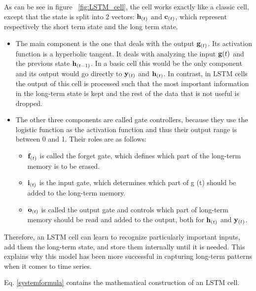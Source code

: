 As can be see in figure ~\ref{fig:LSTM_cell}, the cell works exactly like a classic cell, except that the state is split into 2 vectors: ${\bf h}_{(t)}$ and ${\bf c}_{(t)}$, which represent respectively the short term state and the long term state.
\begin{itemize}
    \item The main component is the one that deals with the output ${\bf g}_{(t)}$. Its activation function is a hyperbolic tangent. It deals with analyzing the input ${\bf g} {(t)}$ and the previous state ${\bf h}_{(t-1)}$. In a basic cell this would be the only component and its output would go directly to ${\bf y }_{(t)}$ and ${\bf h} _{(t)}$. In contrast, in LSTM cells the output of this cell is processed such that the most important information in the long-term state is kept and the rest of the data that is not useful is dropped. 
    \item
        The other three components are called gate controllers, because they use the logistic function as the activation function and thus their output range is between 0 and 1. Their roles are as follows: 
        \begin{itemize}
            \item ${\bf f}_{(t)}$ is called the forget gate, which defines which part of the long-term memory is to be erased. 
            \item ${\bf i}_{(t)}$ is the input gate, which determines which part of g (t) should be added to the long-term memory.
            \item ${\bf o}_{(t)}$ is called the output gate and controls which part of long-term memory should be read and added to the output, both for ${\bf h}_{(t)}$ and ${\bf y}_{(t)}$.
        \end{itemize}
\end{itemize}


Therefore, an LSTM cell can learn to recognize particularly important inputs, add them the long-term state, and store them internally until it is needed. This explains why this model has been more successful in capturing long-term patterns when it comes to time series.

 Eq. \eqref{systemformula} contains the mathematical construction of an LSTM cell.

